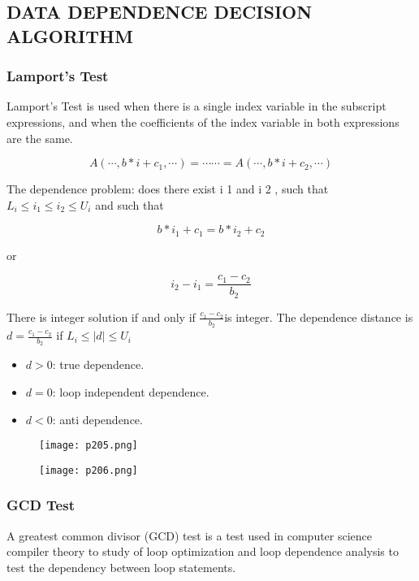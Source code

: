 \subsection{DATA DEPENDENCE DECISION ALGORITHM}


\subsubsection{Lamport's Test}

Lamport’s Test is used when there is a single index variable
in the subscript expressions, and when the coefficients of
the index variable in both expressions are the same.

\[ 
A(    \cdots    , b * i + c_1 ,    \cdots    ) =    \cdots   
   \cdots    = A(    \cdots    , b * i + c_2 ,    \cdots    )
\]


The dependence problem: does there exist i 1 and i 2 , such
that \(L_i \leq i_1 \leq i_2 \leq U_i \) and such that


\[ 
b * i_1 + c_1  =  b * i_2 + c_2
\]

or

\[ 
 i_2 - i _1 = \frac{c_1-c_2}{b_2} 
\]

There is integer solution if and only if \( \frac{c_1-c_2}{b_2}  \)is integer.
The dependence distance is \( d =  \frac{c_1-c_2}{b_2}  \) if \( L_i \leq |d| \leq U_i \)

\begin{itemize}

\item 	$d > 0$:  true dependence.
\item 	$d = 0$:  loop independent dependence.
\item 	$d < 0$:  anti dependence.
\end{itemize}


\begin{figure}[H]
	\centering
	\texttt{[image: p205.png]}
	\caption{}
	\label{fig:p205}
\end{figure}

\begin{figure}[H]
	\centering
	\texttt{[image: p206.png]}
	\caption{}
	\label{fig:p206}
\end{figure}

\subsubsection{GCD Test}
A greatest common divisor (GCD) test is 
a test used in computer science compiler theory to study of 
loop optimization and loop dependence analysis to test the dependency 
between loop statements. \cite{GCDtestW13:online}

